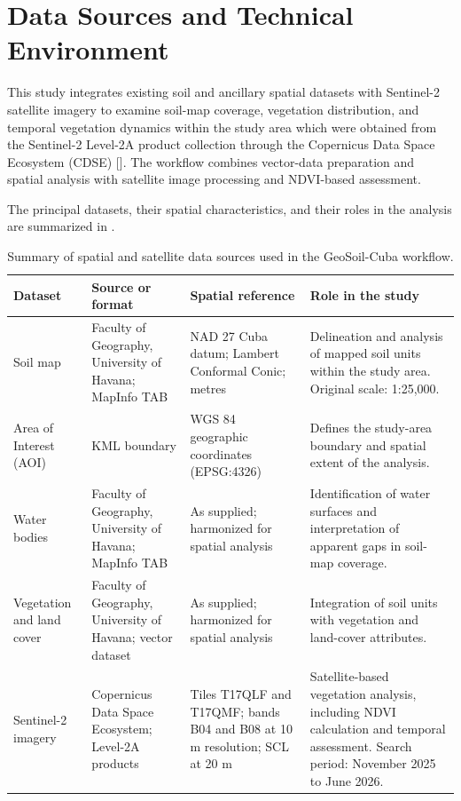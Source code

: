 \section{Data Sources and Technical Environment}
\label{sec:data-sources}

This study integrates existing soil and ancillary
spatial datasets with Sentinel-2 satellite imagery
to examine soil-map coverage, vegetation
distribution, and temporal vegetation dynamics
within the study area which were obtained
from the Sentinel-2 Level-2A product collection
through the Copernicus Data Space Ecosystem (CDSE) \mkbibbrackets{\cite{drusch2012sentinel2}}. The workflow combines
vector-data preparation and spatial analysis
with satellite image processing and NDVI-based
assessment.

The principal datasets, their spatial
characteristics, and their roles in the analysis
are summarized in
.

\begin{table}[H]
	\centering
	\caption{Summary of spatial and satellite data
		sources used in the GeoSoil-Cuba workflow.}
	\label{tab:data-sources}
	\small
	\begin{tabularx}{\textwidth}{
			@{}
			p{2.6cm}
			p{2.5cm}
			p{2.8cm}
			X
			@{}
		}
		\toprule
		\textbf{Dataset} &
		\textbf{Source or format} &
		\textbf{Spatial reference} &
		\textbf{Role in the study} \\
		\midrule
		
		Soil map &
		Faculty of Geography, University of Havana;
		MapInfo TAB &
		NAD 27 Cuba datum; Lambert Conformal Conic;
		metres &
		Delineation and analysis of mapped soil units
		within the study area. Original scale:
		1:25,000. \\
		
		Area of Interest (AOI) &
		KML boundary &
		WGS 84 geographic coordinates
		(EPSG:4326) &
		Defines the study-area boundary and spatial
		extent of the analysis. \\
		
		Water bodies &
		Faculty of Geography, University of Havana;
		MapInfo TAB &
		As supplied; harmonized for spatial analysis &
		Identification of water surfaces and
		interpretation of apparent gaps in soil-map
		coverage. \\
		
		Vegetation and land cover &
		Faculty of Geography, University of Havana;
		vector dataset &
		As supplied; harmonized for spatial analysis &
		Integration of soil units with vegetation
		and land-cover attributes. \\
		
		Sentinel-2 imagery &
		Copernicus Data Space Ecosystem;
		Level-2A products &
		Tiles T17QLF and T17QMF;
		bands B04 and B08 at 10 m resolution;
		SCL at 20 m &
		Satellite-based vegetation analysis,
		including NDVI calculation and temporal
		assessment. Search period: November 2025
		to June 2026. \\
		
		\bottomrule
	\end{tabularx}
\end{table}


